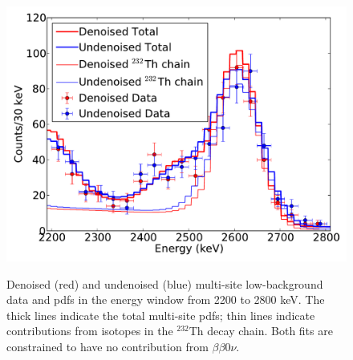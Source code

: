 \begin{figure}
\begin{center}
\includegraphics[keepaspectratio=true,width=\textwidth]{DenoisedVsUndenoised_TotalPdfsWithData_thrange_MS.pdf}
\end{center}
\renewcommand{\baselinestretch}{1}
\small\normalsize
\begin{quote}
\caption{Denoised (red) and undenoised (blue) multi-site low-background data and pdfs in the energy window from 2200 to 2800 keV.  The thick lines indicate the total multi-site pdfs; thin lines indicate contributions from isotopes in the $^{232}$Th decay chain.  Both fits are constrained to have no contribution from $\beta\beta 0\nu$.}
\label{fig:DenoisedComparison_thMS}
\end{quote}
\end{figure}
\renewcommand{\baselinestretch}{2}
\small\normalsize

